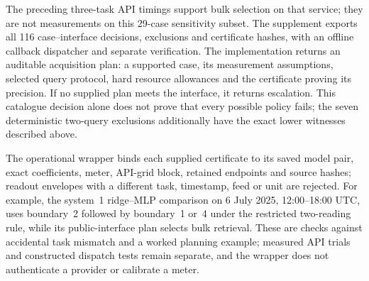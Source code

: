 The preceding three-task API timings support bulk selection on that service;
they are not measurements on this 29-case sensitivity subset. The supplement exports all
116 case--interface decisions, exclusions and certificate hashes, with an
offline callback dispatcher and separate verification. The implementation returns an auditable acquisition plan: a supported
case, its measurement assumptions, selected query protocol, hard resource
allowances and the certificate proving its precision. If no supplied plan
meets the interface, it returns escalation. This catalogue decision alone
does not prove that every possible policy fails; the seven deterministic
two-query exclusions additionally have the exact lower witnesses described
above.

The operational wrapper binds each supplied certificate to its saved model
pair, exact coefficients, meter, API-grid block, retained endpoints and source
hashes; readout envelopes with a different task, timestamp, feed or unit are
rejected. For example, the system~1 ridge--MLP comparison on 6 July 2025,
12:00--18:00 UTC, uses boundary~2 followed by boundary~1 or~4 under the
restricted two-reading rule, while its public-interface plan selects bulk
retrieval. These are checks against accidental task mismatch and a worked
planning example; measured API trials and constructed dispatch tests remain
separate, and the wrapper does not authenticate a provider or calibrate a meter.
